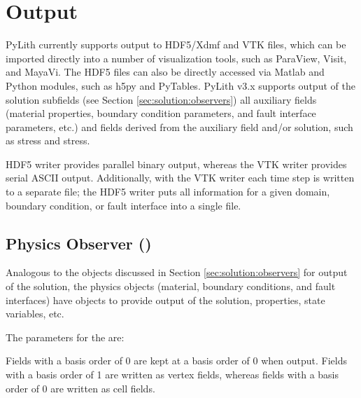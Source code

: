 \section{Output}

PyLith currently supports output to HDF5/Xdmf and VTK files, which can
be imported directly into a number of visualization tools, such as
ParaView, Visit, and MayaVi. The HDF5 files can also be directly
accessed via Matlab and Python modules, such as h5py and
PyTables. PyLith v3.x supports output of the solution subfields (see
Section \vref{sec:solution:observers}) all auxiliary fields
(material properties, boundary condition parameters, and fault interface
parameters, etc.) and fields derived from the auxiliary field and/or
solution, such as stress and stress.

HDF5 writer provides parallel binary output, whereas the VTK writer
provides serial ASCII output. Additionally, with the VTK writer each
time step is written to a separate file; the HDF5 writer puts all
information for a given domain, boundary condition, or fault interface
into a single file.


\subsection{Physics Observer ()}

Analogous to the  objects discussed in Section
\vref{sec:solution:observers} for output of the solution, the physics
objects (material, boundary conditions, and fault interfaces) have
 objects to provide output of the solution,
properties, state variables, etc. 

The parameters for the  are:
\begin{inventory}
\end{inventory}

Fields with a basis order of 0 are kept at a basis order of 0 when output.
Fields with a basis order of 1 are written as vertex fields, whereas fields with a basis order of 0 are written as cell fields.

